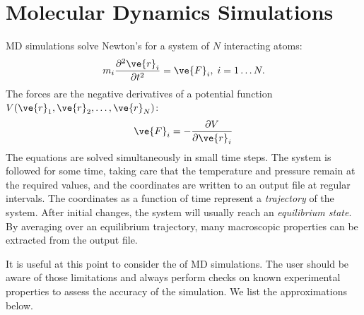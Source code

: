 \section{Molecular Dynamics Simulations}
\label{sec:MDsimulations}
MD simulations solve Newton's  
for a system of $N$ interacting atoms:
\begin{equation}
  m_i \frac{\partial^2 \ve{r}_i}{\partial t^2}  = \ve{F}_i, \;i=1 \ldots N.
\end{equation}
The forces are the negative derivatives of a potential function $V(\ve{r}_1, 
\ve{r}_2, \ldots, \ve{r}_N)$:
\begin{equation}
  \ve{F}_i = - \frac{\partial V}{\partial \ve{r}_i}
\end{equation}
The equations are solved simultaneously in small time steps. The
system is followed for some time, taking care that the temperature and
pressure remain at the required values, and the coordinates are
written to an output file at regular intervals. The coordinates as a
function of time represent a {\em trajectory} of the system. After
initial changes, the system will usually reach an {\em equilibrium
state}. By averaging over an equilibrium trajectory, many macroscopic
properties can be extracted from the output file.

It is useful at this point to consider the  of MD
simulations. The user should be aware of those limitations and always
perform checks on known experimental properties to assess the accuracy
of the simulation. We list the approximations below.

